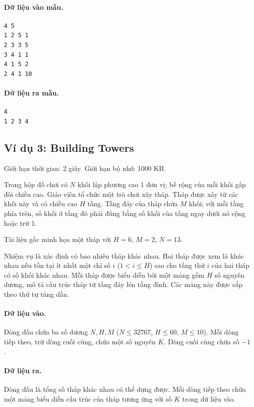 \documentclass[11pt]{article}
\begin{document}
\paragraph{Dữ liệu vào mẫu.}
\begin{verbatim}
4 5
1 2 5 1
2 3 3 5
3 4 1 1
4 1 5 2
2 4 1 10
\end{verbatim}

\paragraph{Dữ liệu ra mẫu.}
\begin{verbatim}
4
1 2 3 4
\end{verbatim}

\subsection{Ví dụ 3: Building Towers}

Giới hạn thời gian: 2 giây. Giới hạn bộ nhớ: 1000 KB.

Trong hộp đồ chơi có \(N\) khối lập phương cao 1 đơn vị; bề rộng của mỗi khối
gấp đôi chiều cao. Giáo viên tổ chức một trò chơi xây tháp. Tháp được xây từ
các khối này và có chiều cao \(H\) tầng. Tầng đáy của tháp chứa \(M\) khối; với
mỗi tầng phía trên, số khối ở tầng đó phải đúng bằng số khối của tầng ngay dưới
nó cộng hoặc trừ 1.

Tài liệu gốc minh họa một tháp với \(H=6\), \(M=2\), \(N=13\).

Nhiệm vụ là xác định có bao nhiêu tháp khác nhau. Hai tháp được xem là khác
nhau nếu tồn tại ít nhất một chỉ số \(i\) (\(1<i\le H\)) sao cho tầng thứ \(i\)
của hai tháp có số khối khác nhau. Mỗi tháp được biểu diễn bởi một mảng gồm
\(H\) số nguyên dương, mô tả cấu trúc tháp từ tầng đáy lên tầng đỉnh. Các mảng
này được sắp theo thứ tự tăng dần.

\paragraph{Dữ liệu vào.}
Dòng đầu chứa ba số dương \(N,H,M\) (\(N\le 32767\), \(H\le 60\),
\(M\le 10\)). Mỗi dòng tiếp theo, trừ dòng cuối cùng, chứa một số nguyên \(K\).
Dòng cuối cùng chứa số \(-1\).

\paragraph{Dữ liệu ra.}
Dòng đầu là tổng số tháp khác nhau có thể dựng được. Mỗi dòng tiếp theo chứa
một mảng biểu diễn cấu trúc của tháp tương ứng với số \(K\) trong dữ liệu vào.
\end{document}
